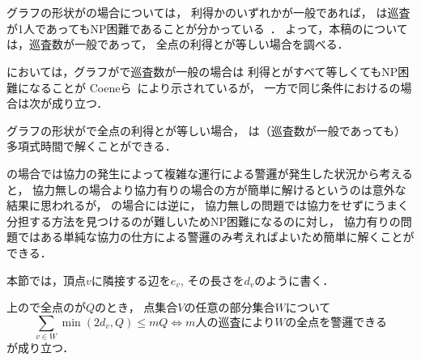 \section{{\graphStar}}
\label{section: star}

グラフの形状が{\graphStar}の場合については，
利得か{\idletime}のいずれかが一般であれば，
{\patProb}は巡査が1人であってもNP困難であることが分かっている~\cite{coene2011charlemagne}．
よって，本稿の{\patProb}については，巡査数が一般であって，
全点の利得と{\idletime}が等しい場合を調べる．

{\patritionedPatProb}においては，グラフが{\graphStar}で巡査数が一般の場合は
利得と{\idletime}がすべて等しくてもNP困難になることが
Coeneら~\cite{coene2011charlemagne}により示されているが，
一方で同じ条件における{\patProb}の場合は次が成り立つ．

\begin{theo}
  \label{theo:StarEqualProfitTimelimit}
  グラフの形状が{\graphStar}で全点の利得と{\idletime}が等しい場合，
  {\patProb}は（巡査数が一般であっても）多項式時間で解くことができる．
\end{theo}


{\graphLine}の場合では協力の発生によって複雑な運行による警邏が発生した状況から考えると，
協力無しの場合より協力有りの場合の方が簡単に解けるというのは意外な結果に思われるが，
{\graphStar}の場合には逆に，
協力無しの問題では協力をせずにうまく分担する方法を見つけるのが難しいためNP困難になるのに対し，
協力有りの問題ではある単純な協力の仕方による警邏のみ考えればよいため簡単に解くことができる．


本節では，頂点$v$に隣接する辺を$e_v$, その長さを$d_v$のように書く．

\begin{lemm}
  \label{lemm:condition_of_guarding_star}
  {\graphStar}上の{\patProb}で全点の{\idletime}が$Q$のとき，
  点集合$V$の任意の部分集合$W$について
  $$
    \sum_{v \in W} \min(2d_v, Q) \leq mQ
    \iff \text{$m$人の巡査により$W$の全点を警邏できる}
  $$
  が成り立つ．
\end{lemm}





